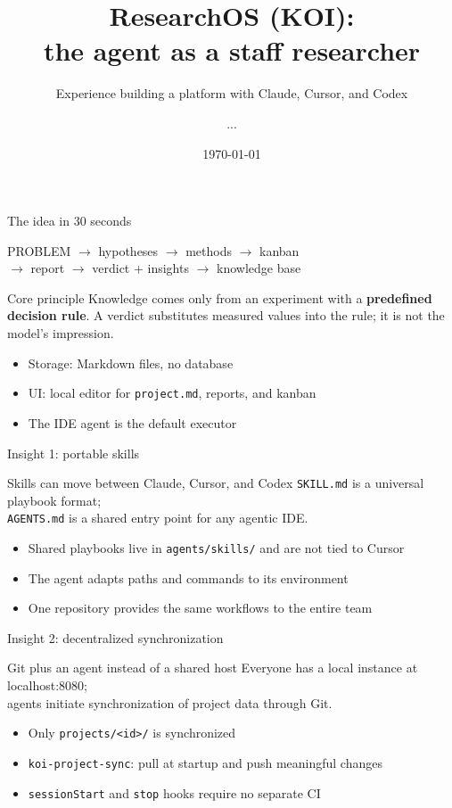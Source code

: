 \documentclass[aspectratio=169,11pt]{beamer}
\title{ResearchOS (KOI):\\the agent as a staff researcher}
\subtitle{Experience building a platform with Claude, Cursor, and Codex}
\author{...}
\institute{...}
\date{\today}
\begin{document}
\begin{frame}
  \titlepage
\end{frame}

\begin{frame}{The idea in 30 seconds}
  \begin{center}
    \small
    PROBLEM $\rightarrow$ hypotheses $\rightarrow$ methods $\rightarrow$ kanban\\
    $\rightarrow$ report $\rightarrow$ verdict + insights $\rightarrow$ knowledge base
  \end{center}
  \vspace{0.5em}
  \begin{block}{Core principle}
    Knowledge comes only from an experiment with a \textbf{predefined decision rule}.
    A verdict substitutes measured values into the rule; it is not the model's impression.
  \end{block}
  \begin{itemize}
    \item Storage: Markdown files, no database
    \item UI: local editor for \texttt{project.md}, reports, and kanban
    \item The IDE agent is the default executor
  \end{itemize}
\end{frame}

\begin{frame}{Insight 1: portable skills}
  \begin{block}{Skills can move between Claude, Cursor, and Codex}
    \texttt{SKILL.md} is a universal playbook format;\\
    \texttt{AGENTS.md} is a shared entry point for any agentic IDE.
  \end{block}
  \begin{itemize}
    \item Shared playbooks live in \texttt{agents/skills/} and are not tied to Cursor
    \item The agent adapts paths and commands to its environment
    \item One repository provides the same workflows to the entire team
  \end{itemize}
\end{frame}

\begin{frame}{Insight 2: decentralized synchronization}
  \begin{block}{Git plus an agent instead of a shared host}
    Everyone has a local instance at localhost:8080;\\
    agents initiate synchronization of project data through Git.
  \end{block}
  \begin{itemize}
    \item Only \texttt{projects/<id>/} is synchronized
    \item \texttt{koi-project-sync}: pull at startup and push meaningful changes
    \item \texttt{sessionStart} and \texttt{stop} hooks require no separate CI
  \end{itemize}
\end{frame}
\end{document}
